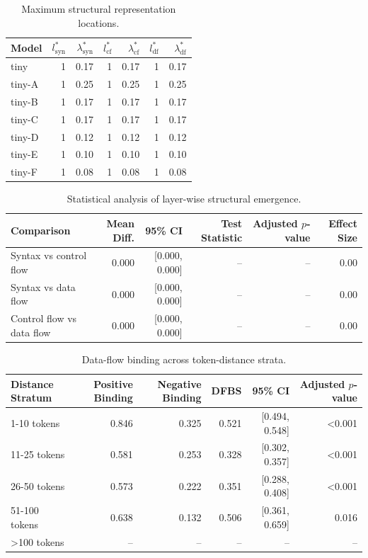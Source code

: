 \begin{table}[t]
\centering
\caption{Maximum structural representation locations.}
\label{tab:peaks}
\begin{tabular}{lrrrrrr}
\toprule
Model & $l^{*}_{\mathrm{syn}}$ & $\lambda^{*}_{\mathrm{syn}}$ & $l^{*}_{\mathrm{cf}}$ & $\lambda^{*}_{\mathrm{cf}}$ & $l^{*}_{\mathrm{df}}$ & $\lambda^{*}_{\mathrm{df}}$ \\
\midrule
tiny & 1 & 0.17 & 1 & 0.17 & 1 & 0.17 \\
tiny-A & 1 & 0.25 & 1 & 0.25 & 1 & 0.25 \\
tiny-B & 1 & 0.17 & 1 & 0.17 & 1 & 0.17 \\
tiny-C & 1 & 0.17 & 1 & 0.17 & 1 & 0.17 \\
tiny-D & 1 & 0.12 & 1 & 0.12 & 1 & 0.12 \\
tiny-E & 1 & 0.10 & 1 & 0.10 & 1 & 0.10 \\
tiny-F & 1 & 0.08 & 1 & 0.08 & 1 & 0.08 \\
\bottomrule
\end{tabular}
\end{table}

\begin{table}[t]
\centering
\caption{Statistical analysis of layer-wise structural emergence.}
\label{tab:emerge}
\begin{tabular}{lrrrrr}
\toprule
Comparison & Mean Diff. & 95\% CI & Test Statistic & Adjusted $p$-value & Effect Size \\
\midrule
Syntax vs control flow & 0.000 & [0.000, 0.000] & -- & -- & 0.00 \\
Syntax vs data flow & 0.000 & [0.000, 0.000] & -- & -- & 0.00 \\
Control flow vs data flow & 0.000 & [0.000, 0.000] & -- & -- & 0.00 \\
\bottomrule
\end{tabular}
\end{table}

\begin{table}[t]
\centering
\caption{Data-flow binding across token-distance strata.}
\label{tab:strata}
\begin{tabular}{lrrrrr}
\toprule
Distance Stratum & Positive Binding & Negative Binding & DFBS & 95\% CI & Adjusted $p$-value \\
\midrule
1-10 tokens & 0.846 & 0.325 & 0.521 & [0.494, 0.548] & \textless{}0.001 \\
11-25 tokens & 0.581 & 0.253 & 0.328 & [0.302, 0.357] & \textless{}0.001 \\
26-50 tokens & 0.573 & 0.222 & 0.351 & [0.288, 0.408] & \textless{}0.001 \\
51-100 tokens & 0.638 & 0.132 & 0.506 & [0.361, 0.659] & 0.016 \\
\textgreater{}100 tokens & -- & -- & -- & -- & -- \\
\bottomrule
\end{tabular}
\end{table}

